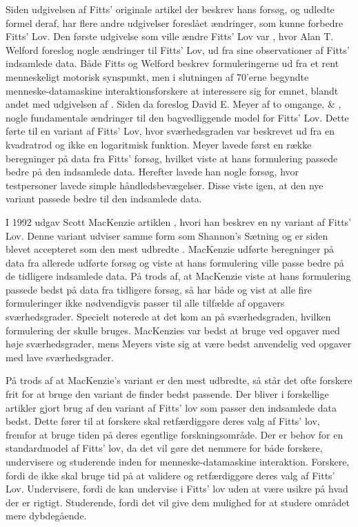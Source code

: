 Siden udgivelsen af Fitts' originale artikel der beskrev hans forsøg, og udledte formel deraf, har flere andre udgivelser foreslået ændringer, som kunne forbedre Fitts' Lov. Den første udgivelse som ville ændre Fitts' Lov var \cite{welford1968}, hvor Alan T. Welford foreslog nogle ændringer til Fitts' Lov, ud fra sine observationer af Fitts' indsamlede data. Både Fitts og Welford beskrev formuleringerne ud fra et rent menneskeligt motorisk synspunkt, men i slutningen af 70'erne begyndte menneske-datamaskine interaktionsforskere at interessere sig for emnet, blandt andet med udgivelsen af \cite{card1978}. Siden da foreslog David E. Meyer af to omgange, \cite{meyer1988} \& \cite{meyer1990}, nogle fundamentale ændringer til den bagvedliggende model for Fitts' Lov. Dette førte til en variant af Fitts' Lov, hvor sværhedsgraden var beskrevet ud fra en kvadratrod og ikke en logaritmisk funktion. Meyer lavede først en række beregninger på data fra Fitts' forsøg, hvilket viste at hans formulering passede bedre på den indsamlede data. Herefter lavede han nogle forsøg, hvor testpersoner lavede simple håndledsbevægelser. Disse viste igen, at den nye variant passede bedre til den indsamlede data.

I 1992 udgav Scott MacKenzie artiklen \cite{mackenzie1992}, hvori han beskrev en ny variant af Fitts' Lov. Denne variant udviser samme form som Shannon's Sætning \cite{goldberg2015} og er siden blevet accepteret som den mest udbredte \cite{guiard2011}. MacKenzie udførte beregninger på data fra allerede udførte forsøg og viste at hans formulering ville passe bedre på de tidligere indsamlede data. På trods af, at MacKenzie viste at hans formulering passede bedst på data fra tidligere forsøg, så har både \cite{drewes2010} og \cite{goldberg2015} vist at alle fire formuleringer ikke nødvendigvis passer til alle tilfælde af opgavers sværhedsgrader. Specielt noterede \cite{goldberg2015} at det kom an på sværhedsgraden, hvilken formulering der skulle bruges. MacKenzies var bedst at bruge ved opgaver med høje sværhedsgrader, mens Meyers viste sig at være bedst anvendelig ved opgaver med lave sværhedsgrader.

På trods af at MacKenzie's variant er den mest udbredte, så står det ofte forskere frit for at bruge den variant de finder bedst passende\cite{drewes2010}. Der bliver i forskellige artikler gjort brug af den variant af Fitts' lov som passer den indsamlede data bedst. Dette fører til at forskere skal retfærdiggøre deres valg af Fitts' lov, fremfor at bruge tiden på deres egentlige forskningsområde\cite{drewes2010}. Der er behov for en standardmodel af Fitts' lov, da det vil gøre det nemmere for både forskere, undervisere og studerende inden for menneske-datamaskine interaktion. Forskere, fordi de ikke skal bruge tid på at validere og retfærdiggøre deres valg af Fitts' Lov. Undervisere, fordi de kan undervise i Fitts' lov uden at være usikre på hvad der er rigtigt. Studerende, fordi det vil give dem mulighed for at studere området mere dybdegående.

